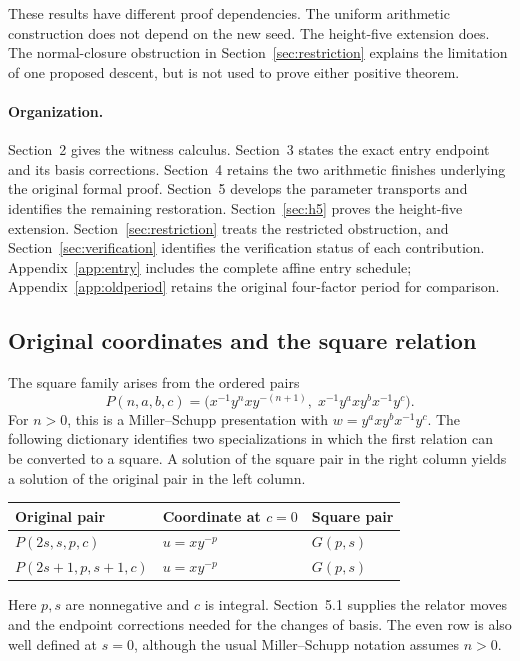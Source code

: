 \documentclass[11pt]{article}
\theoremstyle{definition}\newtheorem{definition}[theorem]{Definition}
\theoremstyle{remark}\newtheorem{remark}[theorem]{Remark}
\begin{document}
These results have different proof dependencies. The uniform arithmetic construction does not depend on the new seed. The height-five extension does. The normal-closure obstruction in Section~\ref{sec:restriction} explains the limitation of one proposed descent, but is not used to prove either positive theorem.

\paragraph{Organization.}
Section~2 gives the witness calculus. Section~3 states the exact entry endpoint and its basis corrections. Section~4 retains the two arithmetic finishes underlying the original formal proof. Section~5 develops the parameter transports and identifies the remaining restoration. Section~\ref{sec:h5} proves the height-five extension. Section~\ref{sec:restriction} treats the restricted obstruction, and Section~\ref{sec:verification} identifies the verification status of each contribution. Appendix~\ref{app:entry} includes the complete affine entry schedule; Appendix~\ref{app:oldperiod} retains the original four-factor period for comparison.

\subsection*{Original coordinates and the square relation}
The square family arises from the ordered pairs
\begin{equation}\label{eq:original}
P(n,a,b,c)=\bigl(x^{-1}y^nxy^{-(n+1)},\;x^{-1}y^axy^bx^{-1}y^c\bigr).
\end{equation}
For $n>0$, this is a Miller--Schupp presentation with $w=y^axy^bx^{-1}y^c$. The following dictionary identifies two specializations in which the first relation can be converted to a square. A solution of the square pair in the right column yields a solution of the original pair in the left column.
\begin{center}
\begin{tabular}{@{}lll@{}}
\toprule
Original pair & Coordinate at $c=0$ & Square pair\\
\midrule
$P(2s,s,p,c)$ & $u=xy^{-p}$ & $G(p,s)$\\
$P(2s+1,p,s+1,c)$ & $u=xy^{-p}$ & $G(p,s)$\\
\bottomrule
\end{tabular}
\end{center}
Here $p,s$ are nonnegative and $c$ is integral. Section~5.1 supplies the relator moves and the endpoint corrections needed for the changes of basis. The even row is also well defined at $s=0$, although the usual Miller--Schupp notation assumes $n>0$.
\end{document}
